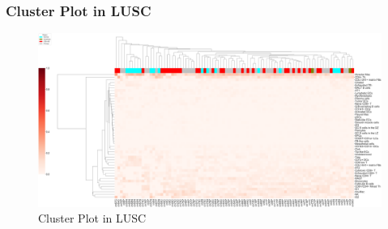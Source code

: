 \documentclass{beamer}
\begin{document}
    \begin{frame}
        \frametitle{Cluster Plot in LUSC}

        \begin{figure}
            \includegraphics[height=0.6 \textheight]{figures/BisqueRNA/clustermap/STAR.SQC.GSE131907.cluster.pdf}
            \caption{Cluster Plot in LUSC}
        \end{figure}
    \end{frame}
\end{document}
